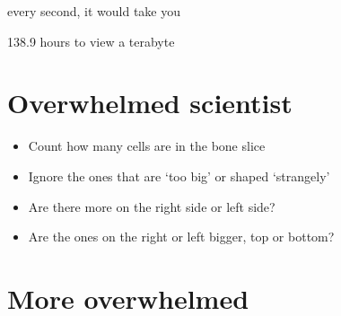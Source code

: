 \documentclass[letterpaper,10pt,english]{sphinxmanual}
\begin{document}
\noindent{}

\sphinxAtStartPar
every second, it would take you

\begin{sphinxVerbatim}[commandchars=\\\{\}]
  
  
\end{sphinxVerbatim}

\begin{sphinxVerbatim}[commandchars=\\\{\}]
138.9 hours to view a terabyte
\end{sphinxVerbatim}


\section{Overwhelmed scientist}
\label{\detokenize{01-Introduction:overwhelmed-scientist}}

\begin{itemize}
\item {} 
\sphinxAtStartPar
Count how many cells are in the bone slice

\item {} 
\sphinxAtStartPar
Ignore the ones that are ‘too big’ or shaped ‘strangely’

\item {} 
\sphinxAtStartPar
Are there more on the right side or left side?

\item {} 
\sphinxAtStartPar
Are the ones on the right or left bigger, top or bottom?

\end{itemize}



\sphinxAtStartPar
{}




\section{More overwhelmed}
\label{\detokenize{01-Introduction:more-overwhelmed}}
\end{document}
